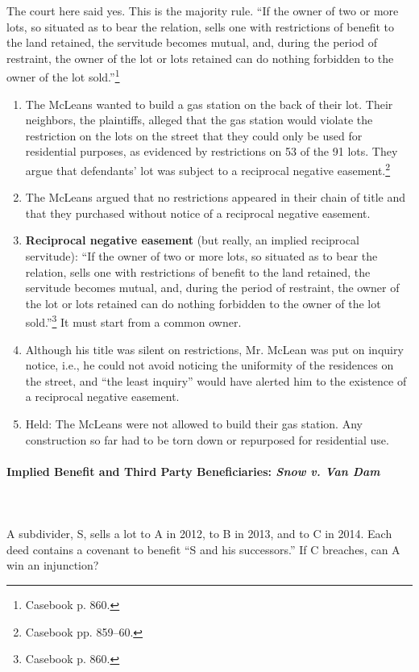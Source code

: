 The court here said yes. This is the majority rule. ``If the owner of two or 
more lots, so situated as to bear the relation, sells one with restrictions of 
benefit to the land retained, the servitude becomes mutual, and, during the 
period of restraint, the owner of the lot or lots retained can do nothing 
forbidden to the owner of the lot sold.''\footnote{Casebook p.  860.}

\begin{enumerate}
    \item The McLeans wanted to build a gas station on the back of their lot. 
    Their neighbors, the plaintiffs, alleged that the gas station would 
    violate the restriction on the lots on the street that they could only be 
    used for residential purposes, as evidenced by restrictions on 53 of the 
    91 lots. They argue that defendants' lot was subject to a reciprocal 
    negative easement.\footnote{Casebook pp. 859--60.}
    \item The McLeans argued that no restrictions appeared in their chain of 
    title and that they purchased without notice of a reciprocal negative 
    easement.
    \item \textbf{Reciprocal negative easement} (but really, an implied 
    reciprocal servitude): ``If the owner of two or more lots, so situated as 
    to bear the relation, sells one with restrictions of benefit to the land 
    retained, the servitude becomes mutual, and, during the period of 
    restraint, the owner of the lot or lots retained can do nothing forbidden 
    to the owner of the lot sold.''\footnote{Casebook p.  860.} It must start 
    from a common owner.
    \item Although his title was silent on restrictions, Mr. McLean was put on 
    inquiry notice, i.e., he could not avoid noticing the uniformity of the 
    residences on the street, and ``the least inquiry'' would have alerted him 
    to the existence of a reciprocal negative easement.
    \item Held: The McLeans were not allowed to build their gas station. Any 
    construction so far had to be torn down or repurposed for residential use.
\end{enumerate}

\paragraph{Implied Benefit and Third Party Beneficiaries: \emph{Snow v. Van 
Dam}}
~\\\\
A subdivider, S, sells a lot to A in 2012, to B in 2013, and to C in 2014. Each 
deed contains a covenant to benefit ``S and his successors.'' If C breaches, 
can A win an injunction?

